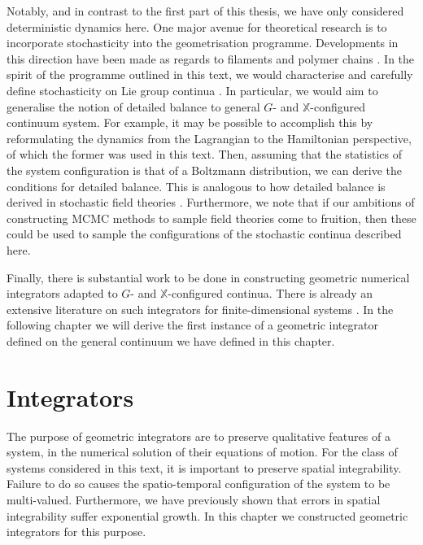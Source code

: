 \documentclass[]{cam-thesis}
\begin{document}
Notably, and in contrast to the first part of this thesis, we have only considered deterministic dynamics here. One major avenue for theoretical research is to incorporate stochasticity into the geometrisation programme. Developments in this direction have been made as regards to filaments and polymer chains \citep{chirikjianStochasticElasticaExcludedVolume2008, bawendiWienerIntegralModel1985, kleinertPathIntegralsQuantum2009, liverpoolProbabilityDistributionWormlike1995}. In the spirit of the programme outlined in this text, we would characterise and carefully define stochasticity on Lie group continua \citep{chirikjianStochasticProcessesLie2012}. In particular, we would aim to generalise the notion of detailed balance to general $G$- and $\mathbb{X}$-configured continuum system. For example, it may be possible to accomplish this by reformulating the dynamics from the Lagrangian to the Hamiltonian perspective, of which the former was used in this text. Then, assuming that the statistics of the system configuration is that of a Boltzmann distribution, we can derive the conditions for detailed balance. This is analogous to how detailed balance is derived in stochastic field theories \citep{catesActiveFieldTheories2019}. Furthermore, we note that if our ambitions of constructing MCMC methods to sample field theories come to fruition, then these could be used to sample the configurations of the stochastic continua described here.

Finally, there is substantial work to be done in constructing geometric numerical integrators adapted to $G$- and $\mathbb{X}$-configured continua. There is already an extensive literature on such integrators for finite-dimensional systems \citep{celledoniIntroductionLieGroup2014c, owrenLieGroupIntegrators2016, iserlesLiegroupMethods2005, celledoniLieGroupIntegrators2022a}. In the following chapter we will derive the first instance of a geometric integrator defined on the general continuum we have defined in this chapter.


\section{Integrators}



The purpose of geometric integrators are to preserve qualitative features of a system, in the numerical solution of their equations of motion. For the class of systems considered in this text, it is important to preserve spatial integrability. Failure to do so causes the spatio-temporal configuration of the system to be multi-valued. Furthermore, we have previously shown that errors in spatial integrability suffer exponential growth. In this chapter we constructed geometric integrators for this purpose.
\end{document}
